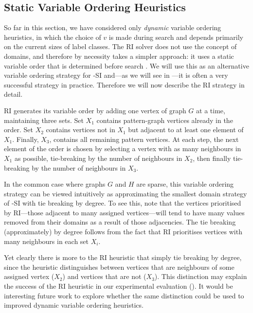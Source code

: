 \subsection{Static Variable Ordering Heuristics}\label{subsec:mcsplit-si-static}

So far in this section, we have considered only \emph{dynamic} variable
ordering heuristics, in which the choice of $v$ is made during search and
depends primarily on the current sizes of label classes.  The RI solver does
not use the concept of domains, and therefore by necessity takes a simpler
approach: it uses a static variable order that is determined before search
\citep{DBLP:journals/tcbb/BonniciG17}.  We will use this as an alternative
variable ordering strategy for \McSplit-SI and---as we will see in
---it is often a very successful strategy in practice.
Therefore we will now describe the RI strategy in detail.

RI generates its variable order by adding one vertex of graph $G$ at a time,
maintaining three sets.  Set $X_1$ contains pattern-graph vertices already in
the order. Set $X_2$ contains vertices not in $X_1$ but adjacent to at least
one element of $X_1$.  Finally, $X_3$, contains all remaining pattern vertices.
At each step, the next element of the order is chosen by selecting a vertex
with as many neighbours in $X_1$ as possible, tie-breaking by the number of
neighbours in $X_2$, then finally tie-breaking by the number of neighbours in
$X_3$.

In the common case where graphs $G$ and $H$ are sparse, this variable
ordering strategy can be viewed intuitively as approximating the smallest
domain strategy of \McSplit-SI with tie breaking by degree.  To see this, note
that the vertices prioritised by RI---those adjacent to many assigned
vertices---will tend to have many values removed from their domains as a result
of those adjacencies.  The tie breaking (approximately) by degree follows from
the fact that RI prioritises vertices with many neighbours in each set $X_i$.

Yet clearly there is more to the RI heuristic that simply tie breaking by
degree, since the heuristic distinguishes between vertices that are neighbours
of some assigned vertex ($X_2$) and vertices that are not ($X_3$). This
distinction may explain the success of the RI heuristic in our experimental
evaluation ().  It would be interesting future work to
explore whether the same distinction could be used to improved dynamic variable
ordering heuristics.

